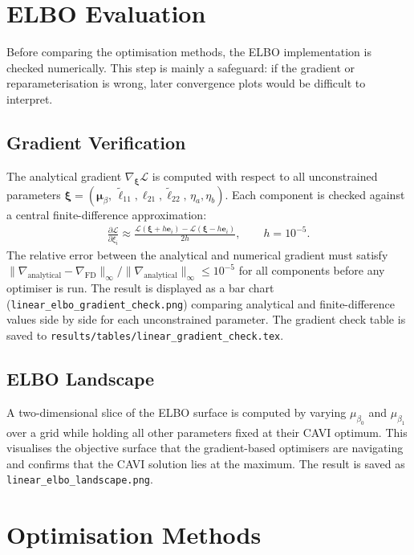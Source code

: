 \documentclass[11pt,a4paper]{article}
\begin{document}
\section{ELBO Evaluation}
\label{sec:elbo-evaluation}

Before comparing the optimisation methods, the ELBO implementation is checked numerically. This step is mainly a safeguard: if the gradient or reparameterisation is wrong, later convergence plots would be difficult to interpret.

\subsection{Gradient Verification}

The analytical gradient $\nabla_{\bm{\xi}}\mathcal{L}$ is computed with respect to all unconstrained
parameters $\bm{\xi} = (\bm{\mu}_\beta,\, \tilde{\ell}_{11}, \ell_{21}, \tilde{\ell}_{22},\, \eta_a, \eta_b)$.
Each component is checked against a central finite-difference approximation:
\begin{align}
  \frac{\partial \mathcal{L}}{\partial \xi_i} \approx \frac{\mathcal{L}(\bm{\xi} + h\bm{e}_i) - \mathcal{L}(\bm{\xi} - h\bm{e}_i)}{2h}, \qquad h = 10^{-5}.
\end{align}
The relative error between the analytical and numerical gradient must satisfy
$\|\nabla_{\mathrm{analytical}} - \nabla_{\mathrm{FD}}\|_\infty / \|\nabla_{\mathrm{analytical}}\|_\infty \leq 10^{-5}$
for all components before any optimiser is run.
The result is displayed as a bar chart (\texttt{linear\_elbo\_gradient\_check.png}) comparing analytical and
finite-difference values side by side for each unconstrained parameter.
The gradient check table is saved to \texttt{results/tables/linear\_gradient\_check.tex}.

\subsection{ELBO Landscape}

A two-dimensional slice of the ELBO surface is computed by varying $\mu_{\beta_0}$ and $\mu_{\beta_1}$
over a grid while holding all other parameters fixed at their CAVI optimum.
This visualises the objective surface that the gradient-based optimisers are navigating and confirms
that the CAVI solution lies at the maximum.
The result is saved as \texttt{linear\_elbo\_landscape.png}.

\section{Optimisation Methods}
\end{document}
